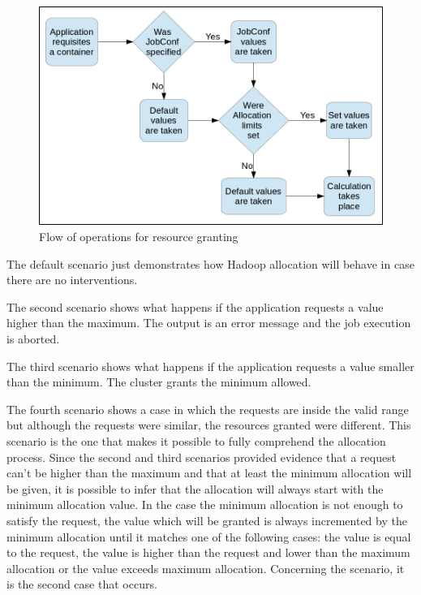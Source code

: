 \begin{figure}[!hbtn]
   \renewcommand{\figurename}{Figure}
   \centering
   \includegraphics[width=15cm]{figuras/Figura18-allocflow.png}
   \caption{Flow of operations for resource granting}
   \label{fig:fluxoAllocation}
\end{figure}

The default scenario just demonstrates how Hadoop allocation will behave in case there are no interventions.

The second scenario shows what happens if the application requests a value higher than the maximum. The output is an error message and the job execution is aborted.

The third scenario shows what happens if the application requests a value smaller than the minimum. The cluster grants the minimum allowed.

The fourth scenario shows a case in which the requests are inside the valid range but although the requests were similar, the resources granted were different. This scenario is the one that makes it possible to fully comprehend the allocation process. Since the second and third scenarios provided evidence that a request can't be higher than the maximum and that at least the minimum allocation will be given, it is possible to infer that the allocation will always start with the minimum allocation value. In the case the minimum allocation is not enough to satisfy the request, the value which will be granted is always incremented by the minimum allocation until it matches one of the following cases: the value is equal to the request, the value is higher than the request and lower than the maximum allocation or the value exceeds maximum allocation. Concerning the scenario, it is the second case that occurs.

